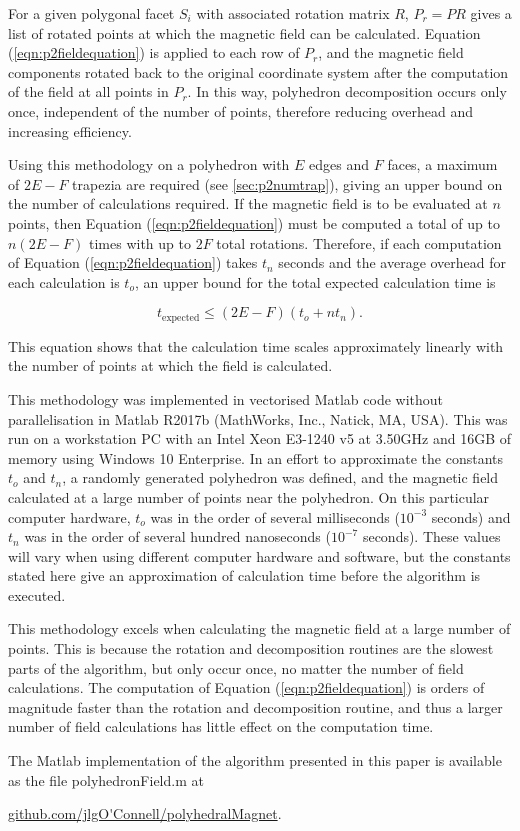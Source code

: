 For a given polygonal facet \(S_{\!i}\) with associated rotation matrix \(R\), \(P_r = PR\) gives a list of rotated points at which the magnetic field can be calculated. Equation (\ref{eqn:p2fieldequation}) is applied to each row of \(P_r\), and the magnetic field components rotated back to the original coordinate system after the computation of the field at all points in \(P_r\). In this way, polyhedron decomposition occurs only once, independent of the number of points, therefore reducing overhead and increasing efficiency.

Using this methodology on a polyhedron with \(E\) edges and \(F\) faces, a maximum of \(2E - F\) trapezia are required (see \ref{sec:p2numtrap}), giving an upper bound on the number of calculations required. If the magnetic field is to be evaluated at \(n\) points, then Equation (\ref{eqn:p2fieldequation}) must be computed a total of up to \(n\left(2E-F\right)\) times with up to \(2F\) total rotations. Therefore, if each computation of Equation (\ref{eqn:p2fieldequation}) takes \(t_n\) seconds and the average overhead for each calculation is \(t_o\), an upper bound for the total expected calculation time is

\begin{equation}
t_{\text{expected}} \leq \left(2E-F\right)\left(t_o + nt_n \right) \text{.}
\end{equation}

\noindent This equation shows that the calculation time scales approximately linearly with the number of points at which the field is calculated.

This methodology was implemented in vectorised Matlab code without parallelisation in Matlab R2017b (MathWorks, Inc., Natick, MA, USA). This was run on a workstation PC with an Intel Xeon E3-1240 v5 at 3.50GHz and 16GB of memory using Windows 10 Enterprise. In an effort to approximate the constants \(t_o\) and \(t_n\), a randomly generated polyhedron was defined, and the magnetic field calculated at a large number of points near the polyhedron. On this particular computer hardware, \(t_o\) was in the order of several milliseconds (\(10^{-3}\) seconds) and \(t_n\) was in the order of several hundred nanoseconds (\(10^{-7}\) seconds). These values will vary when using different computer hardware and software, but the constants stated here give an approximation of calculation time before the algorithm is executed.

This methodology excels when calculating the magnetic field at a large number of points. This is because the rotation and decomposition routines are the slowest parts of the algorithm, but only occur once, no matter the number of field calculations. The computation of Equation (\ref{eqn:p2fieldequation}) is orders of magnitude faster than the rotation and decomposition routine, and thus a larger number of field calculations has little effect on the computation time.

The Matlab implementation of the algorithm presented in this paper is available as the file polyhedronField.m at

\noindent \url{github.com/jlgO'Connell/polyhedralMagnet}.
